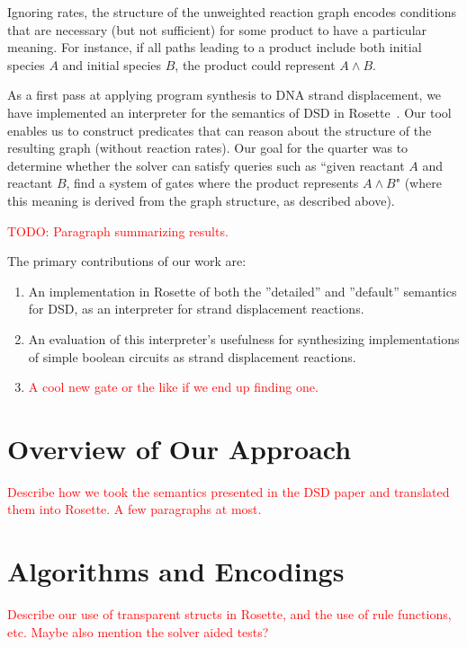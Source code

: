 \documentclass{article}
\begin{document}
Ignoring rates, the structure of the unweighted reaction graph encodes
conditions that are necessary (but not sufficient) for some product to have a
particular meaning. For instance, if all paths leading to a product include both
initial species $A$ and initial species $B$, the product could
represent $A \land B$.

As a first pass at applying program synthesis to DNA strand
displacement, we have implemented an interpreter for the semantics of
DSD in Rosette~\cite{rosette}. Our tool enables us to construct
predicates that can reason about
the structure of the resulting graph (without reaction rates). Our goal
for the quarter was to determine whether
the solver can satisfy queries such as ``given
reactant $A$ and reactant $B$, find a system of gates where the
product represents $A \land B$" (where this meaning is derived from
the graph structure, as described above).

\textcolor{red}{TODO: Paragraph summarizing results.}

The primary contributions of our work are:
\begin{enumerate}
\item
  An implementation in Rosette of both the ''detailed''
  and ''default'' semantics for DSD, as an interpreter for
  strand displacement reactions.

\item
  An evaluation of this interpreter's usefulness for synthesizing
  implementations of simple boolean circuits as strand displacement
  reactions.

\item
  \textcolor{red}{A cool new gate or the like if we end up finding one.}
\end{enumerate}

\section{Overview of Our Approach}

\textcolor{red}{Describe how we took the semantics presented in the DSD paper and translated them into Rosette. A few paragraphs at most.}

\section{Algorithms and Encodings}

\textcolor{red}{Describe our use of transparent structs in Rosette,
  and the use of rule functions, etc. Maybe also mention the solver
  aided tests?}
\end{document}
